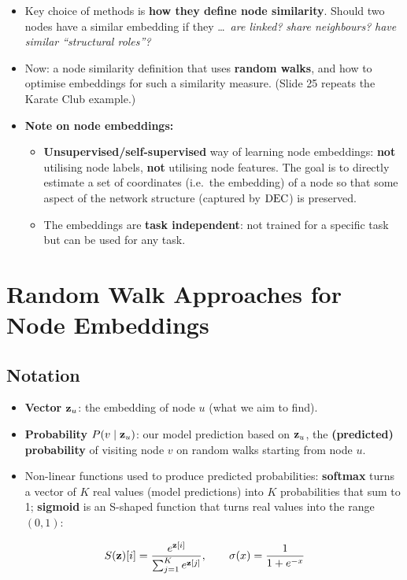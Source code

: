 \begin{itemize}
  \item Key choice of methods is \textbf{how they define node similarity}. Should
    two nodes have a similar embedding if they \ldots\ \emph{are linked?}
    \emph{share neighbours?} \emph{have similar ``structural roles''?}
  \item Now: a node similarity definition that uses \textbf{random walks}, and
    how to optimise embeddings for such a similarity measure. (Slide 25 repeats
    the Karate Club example.)
  \item \textbf{Note on node embeddings:}
    \begin{itemize}
      \item \textbf{Unsupervised/self-supervised} way of learning node
        embeddings: \textbf{not} utilising node labels, \textbf{not} utilising
        node features. The goal is to directly estimate a set of coordinates
        (i.e.\ the embedding) of a node so that some aspect of the network
        structure (captured by $\operatorname{DEC}$) is preserved.
      \item The embeddings are \textbf{task independent}: not trained for a
        specific task but can be used for any task.
    \end{itemize}
\end{itemize}

\section{Random Walk Approaches for Node Embeddings}\label{sec:lec02-rw}

\subsection{Notation}\label{sec:lec02-notation}

\begin{itemize}
  \item \textbf{Vector $\mathbf{z}_u$}: the embedding of node $u$ (what we aim to find).
  \item \textbf{Probability $P(v\mid\mathbf{z}_u)$}: our model prediction based on
    $\mathbf{z}_u$, the \textbf{(predicted) probability} of visiting node $v$ on random
    walks starting from node $u$.
  \item Non-linear functions used to produce predicted probabilities:
    \textbf{softmax} turns a vector of $K$ real values (model predictions) into
    $K$ probabilities that sum to 1; \textbf{sigmoid} is an S-shaped function
    that turns real values into the range $(0,1)$:
\end{itemize}
\begin{equation}\label{eq:lec02-softmaxdef}
  S(\mathbf{z})[i]=\frac{e^{\mathbf{z}[i]}}{\sum_{j=1}^{K}e^{\mathbf{z}[j]}},
  \qquad
  \sigma(x)=\frac{1}{1+e^{-x}}
\end{equation}

